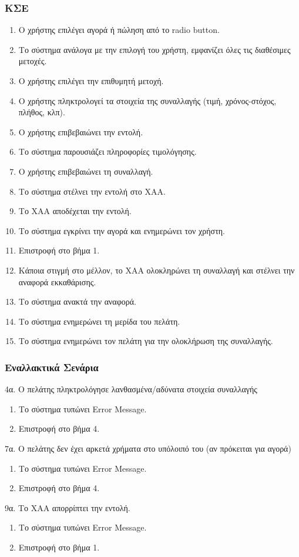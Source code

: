 \documentclass{article}
\begin{document}
\subsubsection{ΚΣΕ}
\begin{enumerate}
	\item Ο χρήστης επιλέγει αγορά ή πώληση από το radio button. 
	\item Το σύστημα ανάλογα με την επιλογή του χρήστη, εμφανίζει όλες τις διαθέσιμες μετοχές.
	\item Ο χρήστης επιλέγει την επιθυμητή μετοχή.
	\item Ο χρήστης πληκτρολογεί τα στοιχεία της συναλλαγής (τιμή, χρόνος-στόχος, πλήθος, κλπ).
	\item Ο χρήστης επιβεβαιώνει την εντολή.
	\item Το σύστημα παρουσιάζει πληροφορίες τιμολόγησης.
	\item Ο χρήστης επιβεβαιώνει τη συναλλαγή.
	\item Το σύστημα στέλνει την εντολή στο ΧΑΑ.
	\item Το ΧΑΑ αποδέχεται την εντολή.
	\item Το σύστημα εγκρίνει την αγορά και ενημερώνει τον χρήστη.
	\item Επιστροφή στο βήμα 1.
	\item Κάποια στιγμή στο μέλλον, το ΧΑΑ ολοκληρώνει τη συναλλαγή και στέλνει την αναφορά εκκαθάρισης.
	\item Το σύστημα ανακτά την αναφορά.
	\item Το σύστημα ενημερώνει τη μερίδα του πελάτη.
	\item Το σύστημα ενημερώνει τον πελάτη για την ολοκλήρωση της συναλλαγής.
\end{enumerate}

\subsubsection{Εναλλακτικά Σενάρια}

4α. Ο πελάτης πληκτρολόγησε λανθασμένα/αδύνατα στοιχεία συναλλαγής
\begin{enumerate}
	\item Το σύστημα τυπώνει Error Message.
	\item Επιστροφή στο βήμα 4.
\end{enumerate}
7α. Ο πελάτης δεν έχει αρκετά χρήματα στο υπόλοιπό του (αν πρόκειται για αγορά)
\begin{enumerate}
	\item Το σύστημα τυπώνει Error Message.
	\item Επιστροφή στο βήμα 4.
\end{enumerate}
9α. Το ΧΑΑ απορρίπτει την εντολή.
\begin{enumerate}
	\item Το σύστημα τυπώνει Error Message.
	\item Επιστροφή στο βήμα 1.
\end{enumerate}
\end{document}
